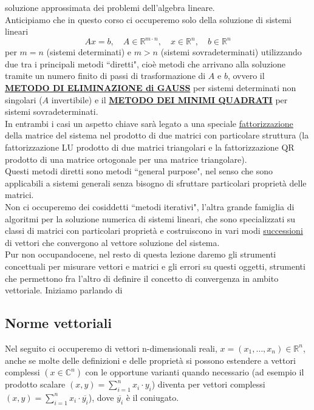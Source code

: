 soluzione approssimata dei problemi dell'algebra lineare.\\
Anticipiamo che in questo corso ci occuperemo solo della soluzione di sistemi lineari
\begin{equation*}
    Ax=b,\quad A\in\mathbb{R}^{m\cdot n}, \quad x\in\mathbb{R}^n,\quad b\in\mathbb{R}^n
\end{equation*}
per $m=n$ (sistemi determinati) e $m>n$ (sistemi sovradeterminati) utilizzando due tra i principali metodi ``diretti", cioè metodi che arrivano alla soluzione tramite un numero finito di passi di trasformazione di $A$ e $b$, ovvero il \uline{\textbf{METODO DI ELIMINAZIONE di GAUSS}} per sistemi determinati
non singolari ($A$ invertibile) e il \uline{\textbf{METODO DEI MINIMI QUADRATI}} per sistemi sovradeterminati.\\In entrambi i casi un aspetto chiave sarà legato a una speciale \uline{fattorizzazione} della matrice del sistema nel prodotto di due matrici con particolare struttura (la fattorizzazione LU prodotto di due matrici triangolari e la fattorizzazione QR prodotto di una matrice ortogonale per una matrice triangolare).\\Questi metodi diretti sono metodi
``general purpose", nel senso che sono applicabili a sistemi generali senza bisogno di sfruttare particolari proprietà delle matrici.\\Non ci occuperemo dei cosiddetti ``metodi iterativi", l'altra grande famiglia di algoritmi per la soluzione numerica di sistemi lineari, che sono specializzati su classi di matrici con particolari proprietà e costruiscono in vari modi \uline{successioni} di vettori che convergono al vettore soluzione del sistema.\\Pur non occupandocene, nel
resto di questa lezione daremo gli strumenti concettuali per misurare vettori e matrici e gli errori su questi oggetti, strumenti che permettono fra l'altro di definire il concetto di convergenza in ambito vettoriale. Iniziamo parlando di

\subsection{Norme vettoriali}
Nel seguito ci occuperemo di vettori n-dimensionali reali, $x = (x_1, \dotso, x_n) \in \mathbb{R}^n$, anche se molte delle definizioni e delle proprietà si possono estendere
a vettori complessi $(x \in \mathbb{C}^n)$ con le opportune varianti quando necessario (ad esempio il prodotto scalare $(x,y) = \sum\limits_{i=1}^n x_i \cdot y_i$) diventa per vettori complessi $(x,y) = \sum\limits_{i=1}^n x_i \cdot \overline{y_i}$), dove $\overline{y_i}$ è il coniugato.

